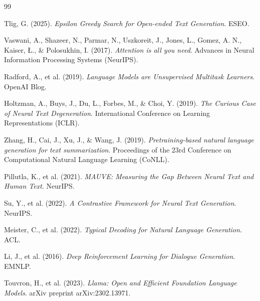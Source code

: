 \documentclass[12pt,a4paper]{article}
\begin{document}
\begin{thebibliography}{99} %

Tlig, G. (2025).
\textit{Epsilon Greedy Search for Open-ended Text Generation}.
ESEO.

Vaswani, A., Shazeer, N., Parmar, N., Uszkoreit, J., Jones, L., Gomez, A. N., Kaiser, \L., \& Polosukhin, I. (2017).
\textit{Attention is all you need}.
Advances in Neural Information Processing Systems (NeurIPS).

Radford, A., et al. (2019).
\textit{Language Models are Unsupervised Multitask Learners}.
OpenAI Blog.

Holtzman, A., Buys, J., Du, L., Forbes, M., \& Choi, Y. (2019).
\textit{The Curious Case of Neural Text Degeneration}.
International Conference on Learning Representations (ICLR).

Zhang, H., Cai, J., Xu, J., \& Wang, J. (2019).
\textit{Pretraining-based natural language generation for text summarization}.
Proceedings of the 23rd Conference on Computational Natural Language Learning (CoNLL).

Pillutla, K., et al. (2021).
\textit{MAUVE: Measuring the Gap Between Neural Text and Human Text}.
NeurIPS.

Su, Y., et al. (2022).
\textit{A Contrastive Framework for Neural Text Generation}.
NeurIPS.

Meister, C., et al. (2022).
\textit{Typical Decoding for Natural Language Generation}.
ACL.

Li, J., et al. (2016).
\textit{Deep Reinforcement Learning for Dialogue Generation}.
EMNLP.

Touvron, H., et al. (2023).
\textit{Llama: Open and Efficient Foundation Language Models}.
arXiv preprint arXiv:2302.13971.

\end{thebibliography}
\end{document}

